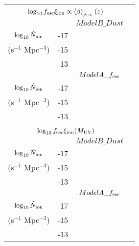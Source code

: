 \begin{table}
\begin{tabular}{cc|cccccc}
	 \multicolumn{7}{c}{}\\
	 \multicolumn{7}{c}{$\log_{10}f_{\rm{esc}}\xi_{\rm{ion}} \propto \left \langle \beta  \right \rangle_{\rho_{\rm{UV}}}(z)$}\\ \hline
	
	  & & \multicolumn{5}{c}{$ModelB\_Dust$}\\
	  
$\log_{10} \dot{N}_{\rm{ion}}$	 		& -17 &  \\
(s$^{-1}$ Mpc$^{-3}$) 				& -15 &  \\
												& -13 &  \\
												
	  & & \multicolumn{5}{c}{$ModelA\_f_{\rm{esc}}$}\\
	  
$\log_{10} \dot{N}_{\rm{ion}}$	 		& -17 &  \\
(s$^{-1}$ Mpc$^{-3}$) 				& -15 &  \\
												& -13 &  \\											

	 \multicolumn{7}{c}{}\\
	 \multicolumn{7}{c}{$\log_{10}f_{\rm{esc}}\xi_{\rm{ion}}(M_{\rm{UV}})$}\\\hline
	 
	  & & \multicolumn{5}{c}{$ModelB\_Dust$}\\
	  
$\log_{10} \dot{N}_{\rm{ion}}$	 		& -17 &  \\
(s$^{-1}$ Mpc$^{-3}$) 				& -15 &  \\
												& -13 &  \\
												
	  & & \multicolumn{5}{c}{$ModelA\_f_{\rm{esc}}$}\\
	  
$\log_{10} \dot{N}_{\rm{ion}}$	 		& -17 &  \\
(s$^{-1}$ Mpc$^{-3}$) 				& -15 &  \\
												& -13 &  \\		


\end{tabular}
\end{table}
